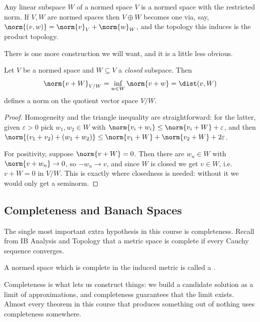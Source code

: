 \begin{example}
	Any linear subspace $W$ of a normed space $V$ is a normed space with the restricted norm. If $V, W$ are normed spaces then $V \oplus W$ becomes one via, say, $\norm{(v,w)} = \norm{v}_V + \norm{w}_W$, and the topology this induces is the product topology.
\end{example}

There is one more construction we will want, and it is a little less obvious.

\begin{proposition}
	Let $V$ be a normed space and $W \subseteq V$ a \emph{closed} subspace. Then
	$$\norm{v + W}_{V/W} = \inf_{w \in W} \norm{v + w} = \dist(v, W)$$
	defines a norm on the quotient vector space $V/W$.
\end{proposition}

\begin{proof}
	Homogeneity and the triangle inequality are straightforward: for the latter, given $\varepsilon > 0$ pick $w_1, w_2 \in W$ with $\norm{v_i + w_i} \leq \norm{v_i + W} + \varepsilon$, and then $\norm{(v_1 + v_2) + (w_1 + w_2)} \leq \norm{v_1 + W} + \norm{v_2 + W} + 2\varepsilon$.

	For positivity, suppose $\norm{v + W} = 0$. Then there are $w_n \in W$ with $\norm{v + w_n} \to 0$, so $-w_n \to v$, and since $W$ is closed we get $v \in W$, i.e.\ $v + W = 0$ in $V/W$. This is exactly where closedness is needed: without it we would only get a seminorm.
\end{proof}

\subsection{Completeness and Banach Spaces}

The single most important extra hypothesis in this course is completeness. Recall from IB Analysis and Topology that a metric space is complete if every Cauchy sequence converges.

\begin{definition}
	A normed space which is complete in the induced metric is called a .
\end{definition}

Completeness is what lets us construct things: we build a candidate solution as a limit of approximations, and completeness guarantees that the limit exists. Almost every theorem in this course that produces something out of nothing uses completeness somewhere.

